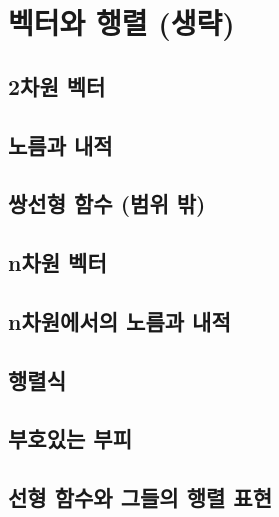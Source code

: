 \section{벡터와 행렬 (생략)}
\subsection{2차원 벡터}

\subsection{노름과 내적}

\subsection{쌍선형 함수 (범위 밖)}

\subsection{n차원 벡터}

\subsection{n차원에서의 노름과 내적}

\subsection{행렬식}

\subsection{부호있는 부피}

\subsection{선형 함수와 그들의 행렬 표현}
